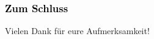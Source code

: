 \documentclass[xcolor=dvipsnames]{beamer}
\begin{document}
\begin{frame}[plain]
\frametitle{\textcolor{black}{Zum Schluss}}
Vielen Dank für eure Aufmerksamkeit!
\end{frame}

\end{document}
